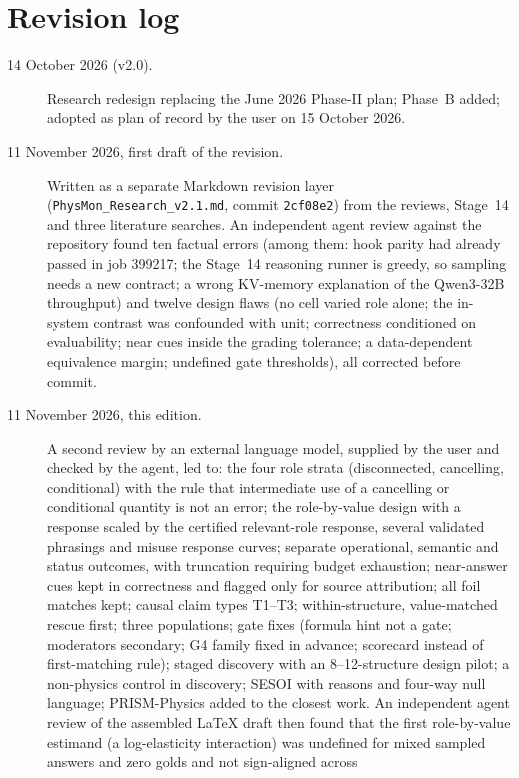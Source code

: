 \documentclass[10pt,a4paper]{article}
\begin{document}
\section{Revision log}
\label{app:revisions}

\begin{description}
\item[14 October 2026 (v2.0).] Research redesign replacing the June 2026 Phase-II plan; Phase~B added; adopted as
plan of record by the user on 15 October 2026.
\item[11 November 2026, first draft of the revision.] Written as a separate Markdown revision layer
(\texttt{PhysMon\_Research\_v2.1.md}, commit \texttt{2cf08e2}) from the reviews, Stage~14 and three literature
searches. An independent agent review against the repository found ten factual errors (among them: hook parity
had already passed in job 399217; the Stage~14 reasoning runner is greedy, so sampling needs a new contract; a
wrong KV-memory explanation of the Qwen3-32B throughput) and twelve design flaws (no cell varied role alone; the
in-system contrast was confounded with unit; correctness conditioned on evaluability; near cues inside the
grading tolerance; a data-dependent equivalence margin; undefined gate thresholds), all corrected before commit.
\item[11 November 2026, this edition.] A second review by an external language model, supplied by the user and
checked by the agent, led to: the four role strata (disconnected, cancelling, conditional) with the rule that
intermediate use of a cancelling or conditional quantity is not an error; the role-by-value design with a response
scaled by the certified relevant-role response, several validated phrasings and misuse response curves; separate
operational, semantic and status outcomes, with truncation requiring budget exhaustion; near-answer cues kept in
correctness and flagged only for source attribution; all foil matches kept; causal claim types T1--T3; within-structure,
value-matched rescue first; three populations; gate fixes (formula hint not a gate; moderators secondary; G4 family
fixed in advance; scorecard instead of first-matching rule); staged discovery with an 8--12-structure design pilot;
a non-physics control in discovery; SESOI with reasons and four-way null language; PRISM-Physics added to the
closest work. An independent agent review of the assembled LaTeX draft then found that the first role-by-value estimand (a
log-elasticity interaction) was undefined for mixed sampled answers and zero golds and not sign-aligned across

\end{description}
\end{document}
